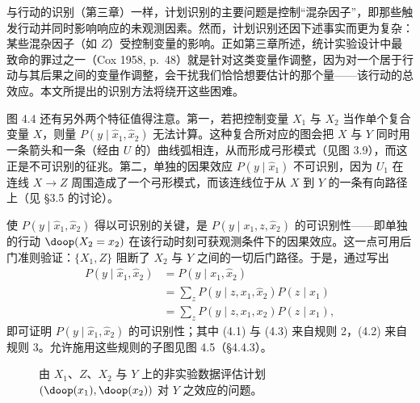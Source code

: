 与行动的识别（第三章）一样，计划识别的主要问题是控制“混杂因子”，即那些触发行动并同时影响响应的未观测因素。然而，计划识别还因下述事实而更为复杂：某些混杂因子（如 $Z$）受控制变量的影响。正如第三章所述，统计实验设计中最致命的罪过之一（Cox 1958, p.~48）就是针对这类变量作调整，因为对一个居于行动与其后果之间的变量作调整，会干扰我们恰恰想要估计的那个量——该行动的总效应。本文所提出的识别方法将绕开这些困难。

图 4.4 还有另外两个特征值得注意。第一，若把控制变量 $X_1$ 与 $X_2$ 当作单个复合变量 $X$，则量 $P(y\mid\hat{x}_1,\hat{x}_2)$ 无法计算。这种复合所对应的图会把 $X$ 与 $Y$ 同时用一条箭头和一条（经由 $U$ 的）曲线弧相连，从而形成弓形模式（见图 3.9），而这正是不可识别的征兆。第二，单独的因果效应 $P(y\mid\hat{x}_1)$ 不可识别，因为 $U_1$ 在连线 $X\to Z$ 周围造成了一个弓形模式，而该连线位于从 $X$ 到 $Y$ 的一条有向路径上（见 \S 3.5 的讨论）。

使 $P(y\mid\hat{x}_1,\hat{x}_2)$ 得以可识别的关键，是 $P(y\mid x_1,z,\hat{x}_2)$ 的可识别性——即单独的行动 $\doop(X_2=x_2)$ 在该行动时刻可获观测条件下的因果效应。这一点可用后门准则验证：$\{X_1,Z\}$ 阻断了 $X_2$ 与 $Y$ 之间的一切后门路径。于是，通过写出
\begin{align}
P(y\mid\hat{x}_1,\hat{x}_2) &= P(y\mid x_1,\hat{x}_2) \tag{4.1}\\
&= \sum_z P(y\mid z,x_1,\hat{x}_2)P(z\mid x_1) \tag{4.2}\\
&= \sum_z P(y\mid z,x_1,x_2)P(z\mid x_1), \tag{4.3}
\end{align}
即可证明 $P(y\mid\hat{x}_1,\hat{x}_2)$ 的可识别性；其中 \textup{(4.1)} 与 \textup{(4.3)} 来自规则 2，\textup{(4.2)} 来自规则 3。允许施用这些规则的子图见图 4.5（\S 4.4.3）。

\begin{figure}[htbp]
\centering
{}
\caption{由 $X_1$、$Z$、$X_2$ 与 $Y$ 上的非实验数据评估计划 $(\doop(x_1),\doop(x_2))$ 对 $Y$ 之效应的问题。}
\label{fig:4.4}
\end{figure}

